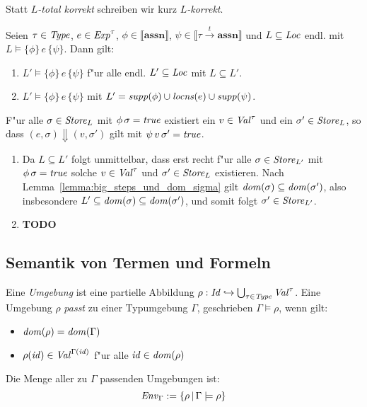 \documentclass[12pt,a4paper,bigheadings]{scrartcl}
\newcommand{\semantic}[1]{\ensuremath{\llbracket#1\rrbracket}}
\newcommand{\assn}{\ensuremath{\mathbf{assn}}}
\newcommand{\locns}{\name{locns}}
\newcommand{\supp}{\name{supp}}
\newcommand{\tto}{\ensuremath{\xrightarrow{t}}}
\newcommand{\TC}[4]{#1 \models \{#2\}\,#3\,\{#4\}}
\begin{document}
Statt {\em $L$-total korrekt} schreiben wir kurz {\em $L$-korrekt}.

\begin{lemma}
  Seien $\tau\in{\text{\it Type\/}}$, $e \in {\text{\it Exp\/}}^\tau$, $\phi\in\semantic{\assn}$,
  $\psi \in \semantic{\tau\tto\assn}$ und $L \subseteq {\text{\it Loc\/}}$ endl.
  mit $\TC{L}{\phi}{e}{\psi}$. Dann gilt:
  \begin{enumerate}
    \item $\TC{L'}{\phi}{e}{\psi}$ f"ur alle endl. $L' \subseteq {\text{\it Loc\/}}$ mit $L \subseteq L'$.
    \item $\TC{L'}{\phi}{e}{\psi}$ mit $L' = \supp(\phi) \cup \locns(e) \cup \supp(\psi)$.
  \end{enumerate}
\end{lemma}

\begin{beweis}
  F"ur alle $\sigma \in {\text{\it Store\/}}_L$ mit $\phi\,\sigma = {\text{\it true\/}}$ existiert ein $v\in{\text{\it Val\/}}^\tau$ und
  ein $\sigma'\in{\text{\it Store\/}}_L$, so dass $(e,\sigma) \Downarrow (v,\sigma')$ gilt mit $\psi\,v\,\sigma'={\text{\it true\/}}$.
  \begin{enumerate}
    \item Da $L \subseteq L'$ folgt unmittelbar, dass erst recht f"ur alle $\sigma\in{\text{\it Store\/}}_{L'}$ mit
          $\phi\,\sigma={\text{\it true\/}}$ solche $v\in{\text{\it Val\/}}^\tau$ und $\sigma'\in{\text{\it Store\/}}_L$ existieren.
          Nach Lemma~\ref{lemma:big_steps_und_dom_sigma} gilt ${\text{\it dom\/}}(\sigma) \subseteq {\text{\it dom\/}}(\sigma')$, also
          insbesondere $L' \subseteq {\text{\it dom\/}}(\sigma) \subseteq {\text{\it dom\/}}(\sigma')$, und somit folgt
          $\sigma'\in{\text{\it Store\/}}_{L'}$.

    \item {\bf TODO}
  \end{enumerate}
\end{beweis}


\subsection{Semantik von Termen und Formeln}

Eine {\em Umgebung} ist eine partielle Abbildung $\rho:{\text{\it Id\/}}\hookrightarrow\bigcup_{\tau\in{\text{\it Type\/}}} {\text{\it Val\/}}^\tau$.
Eine Umgebung $\rho$ {\em passt} zu einer Typumgebung $\Gamma$, geschrieben $\Gamma \models \rho$,
wenn gilt:
\begin{itemize}
  \item ${\text{\it dom\/}}(\rho) = {\text{\it dom\/}}(\Gamma)$
  \item $\rho({\text{\it id\/}}) \in {\text{\it Val\/}}^{\Gamma({\text{\it id\/}})}$ f"ur alle ${\text{\it id\/}}\in{\text{\it dom\/}}(\rho)$
\end{itemize}
Die Menge aller zu $\Gamma$ passenden Umgebungen ist:
\[
  {\text{\it Env\/}}_\Gamma := \{\rho\,|\,\Gamma \models \rho\}
\]
\end{document}

